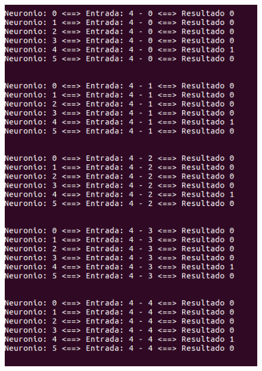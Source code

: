 \documentclass[hidelinks,12pt]{article}
\begin{document}
		\begin{figure}[!h]
			\centering
			\includegraphics[scale=0.5]{Figures/E3S4P1.png}
		\end{figure}
		
\end{document}
